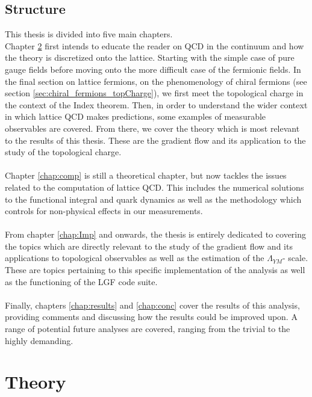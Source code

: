 \documentclass[a4paper,10pt]{book}
\begin{document}
\section{Structure}
This thesis is divided into five main chapters.\\ Chapter \ref{chap:theory} first intends to educate the reader on QCD in the continuum and how the theory is discretized onto the lattice. Starting with the simple case of pure gauge fields before moving onto the more difficult case of the fermionic fields. In the final section on lattice fermions, on the phenomenology of chiral fermions (see section \ref{sec:chiral_fermions_topCharge}), we first meet the topological charge in the context of the Index theorem. Then, in order to understand the wider context in which lattice QCD makes predictions, some examples of measurable observables are covered. From there, we cover the theory which is most relevant to the results of this thesis. These are the gradient flow and its application to the study of the topological charge.\\\\Chapter \ref{chap:comp} is still a theoretical chapter, but now tackles the issues related to the computation of lattice QCD. This includes the numerical solutions to the functional integral and quark dynamics as well as the methodology which controls for non-physical effects in our measurements.\\\\From chapter \ref{chap:Imp} and onwards, the thesis is entirely dedicated to covering the topics which are directly relevant to the study of the gradient flow and its applications to topological observables as well as the estimation of the $\Lambda_{YM}$- scale.\\These are topics pertaining to this specific implementation of the analysis as well as the functioning of the LGF code suite.\\\\Finally, chapters \ref{chap:results} and \ref{chap:conc} cover the results of this analysis, providing comments and discussing how the results could be improved upon. A range of potential future analyses are covered, ranging from the trivial to the highly demanding.

\chapter{Theory}\label{chap:theory}
\end{document}
